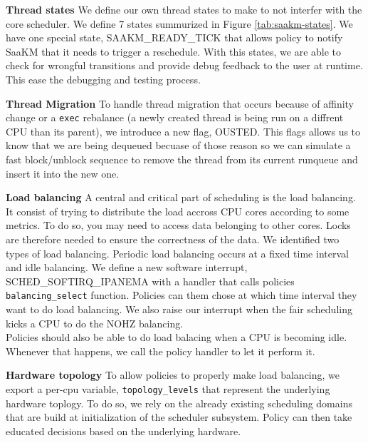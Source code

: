 \par \textbf{Thread states} We define our own thread states to make to not interfer with the core scheduler. We define 7 states summurized in Figure \ref{tab:saakm-states}. We have one special state, SAAKM\_READY\_TICK that allows policy to notify SaaKM that it needs to trigger a reschedule. With this states, we are able to check for wrongful transitions and provide debug feedback to the user at runtime. This ease the debugging and testing process. 

\par \textbf{Thread Migration} To handle thread migration that occurs because of affinity change or a \texttt{exec} rebalance (a newly created thread is being run on a diffrent CPU than its parent), we introduce a new flag, OUSTED. This flags allows us to know that we are being dequeued becuase of those reason so we can simulate a fast block/unblock sequence to remove the thread from its current runqueue and insert it into the new one. 

\par \textbf{Load balancing} A central and critical part of scheduling is the load balancing. It consist of trying to distribute the load accross CPU cores according to some metrics. To do so, you may need to access data belonging to other cores. Locks are therefore needed to ensure the correctness of the data. We identified two types of load balancing. Periodic load balancing occurs at a fixed time interval and idle balancing. We define a new software interrupt, SCHED\_SOFTIRQ\_IPANEMA with a handler that calls policies \texttt{balancing\_select} function. Policies can them chose at which time interval they want to do load balancing. We also raise our interrupt when the fair scheduling kicks a CPU to do the NOHZ balancing. \\
Policies should also be able to do load balacing when a CPU is becoming idle. Whenever that happens, we call the policy handler to let it perform it. 

\par \textbf{Hardware topology} To allow policies to properly make load balancing, we export a per-cpu variable, \texttt{topology\_levels} that represent the underlying hardware toplogy. To do so, we rely on the already existing scheduling domains that are build at initialization of the scheduler subsystem. Policy can then take educated decisions based on the underlying hardware.

